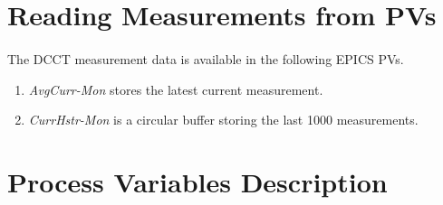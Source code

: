 \documentclass[openany]{article}
\begin{document}
\section{Reading Measurements from PVs}

	\paragraph{} The DCCT measurement data is available in the following EPICS PVs.

		\begin{enumerate}
			\item \emph{AvgCurr-Mon} stores the latest current measurement.
			\item \emph{CurrHstr-Mon} is a circular buffer storing the last 1000 measurements.
		\end{enumerate}

\section{Process Variables Description}\label{sec:process-variables}
\end{document}
